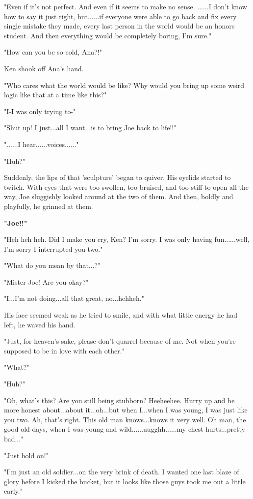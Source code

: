 \documentclass[
]{article}
\begin{document}
"Even if it's not perfect. And even if it seems to make no sense.
......I don't know how to say it just right, but......if everyone were
able to go back and fix every single mistake they made, every last
person in the world would be an honors student. And then everything
would be completely boring, I'm sure."

"How can you be so cold, Ana?!"

Ken shook off Ana's hand.

"Who cares what the world would be like? Why would you bring up some
weird logic like that at a time like this?"

"I-I was only trying to-"

"Shut up! I just...all I want...is to bring Joe back to life!!"

"......I hear......voices......"

"Huh?"

Suddenly, the lips of that 'sculpture' began to quiver. His eyelids
started to twitch. With eyes that were too swollen, too bruised, and too
stiff to open all the way, Joe sluggishly looked around at the two of
them. And then, boldly and playfully, he grinned at them.

\textbf{"Joe!!"}

"Heh heh heh. Did I make you cry, Ken? I'm sorry. I was only having
fun......well, I'm sorry I interrupted you two."

"What do you mean by that...?"

"Mister Joe! Are you okay?"

"I...I'm not doing...all that great, no...hehheh."

His face seemed weak as he tried to smile, and with what little energy
he had left, he waved his hand.

"Just, for heaven's sake, please don't quarrel because of me. Not when
you're supposed to be in love with each other."

"What?"

"Huh?"

"Oh, what's this? Are you still being stubborn? Heeheehee. Hurry up and
be more honest about...about it...oh...but when I...when I was young, I
was just like you two. Ah, that's right. This old man knows...knows it
very well. Oh man, the good old days, when I was young and
wild......uugghh......my chest hurts...pretty bad..."

"Just hold on!"

"I'm just an old soldier...on the very brink of death. I wanted one last
blaze of glory before I kicked the bucket, but it looks like those guys
took me out a little early."
\end{document}

